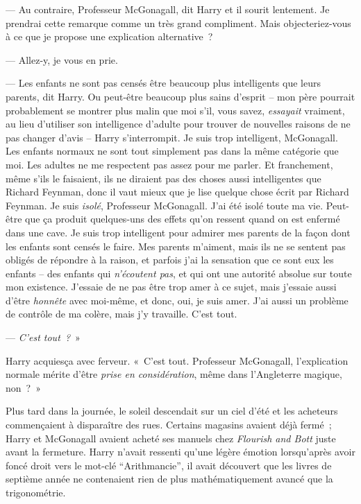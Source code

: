 --- Au contraire, Professeur McGonagall, dit Harry et il sourit lentement. Je prendrai cette remarque comme un très grand compliment. Mais objecteriez-vous à ce que je propose une explication alternative~?

--- Allez-y, je vous en prie.

--- Les enfants ne sont pas censés être beaucoup plus intelligents que leurs parents, dit Harry. Ou peut-être beaucoup plus sains d'esprit -- mon père pourrait probablement se montrer plus malin que moi s'il, vous savez, \emph{essayait} vraiment, au lieu d'utiliser son intelligence d'adulte pour trouver de nouvelles raisons de ne pas changer d'avis -- Harry s'interrompit. Je suis trop intelligent, McGonagall. Les enfants normaux ne sont tout simplement pas dans la même catégorie que moi. Les adultes ne me respectent pas assez pour me parler. Et franchement, même s'ils le faisaient, ils ne diraient pas des choses aussi intelligentes que Richard Feynman, donc il vaut mieux que je lise quelque chose écrit par Richard Feynman. Je suis \emph{isolé}, Professeur McGonagall. J'ai été isolé toute ma vie. Peut-être que ça produit quelques-uns des effets qu'on ressent quand on est enfermé dans une cave. Je suis trop intelligent pour admirer mes parents de la façon dont les enfants sont censés le faire. Mes parents m'aiment, mais ils ne se sentent pas obligés de répondre à la raison, et parfois j'ai la sensation que ce sont eux les enfants -- des enfants qui \emph{n'écoutent pas}, et qui ont une autorité absolue sur toute mon existence. J'essaie de ne pas être trop amer à ce sujet, mais j'essaie aussi d'être \emph{honnête} avec moi-même, et donc, oui, je suis amer. J'ai aussi un problème de contrôle de ma colère, mais j'y travaille. C'est tout.

--- \emph{C'est tout~?}~»

Harry acquiesça avec ferveur. «~C'est tout. Professeur McGonagall, l'explication normale mérite d'être \emph{prise en considération}, même dans l'Angleterre magique, non~?~»

\later

Plus tard dans la journée, le soleil descendait sur un ciel d'été et les acheteurs commençaient à disparaître des rues. Certains magasins avaient déjà fermé~; Harry et McGonagall avaient acheté ses manuels chez \emph{Flourish and Bott} juste avant la fermeture. Harry n'avait ressenti qu'une légère émotion lorsqu'après avoir foncé droit vers le mot-clé “Arithmancie”, il avait découvert que les livres de septième année ne contenaient rien de plus mathématiquement avancé que la trigonométrie.

